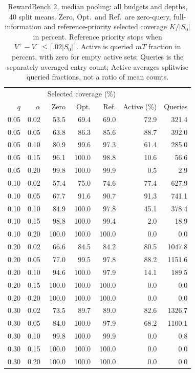 \begin{table}[t]
\centering\small
\begin{tabular}{rrrrrrr}
\toprule
 & & \multicolumn{3}{c}{Selected coverage (\%)} & & \\
$q$ & $\alpha$ & Zero & Opt. & Ref. & Active (\%) & Queries \\
\midrule
0.05 & 0.02 & 53.5 & 69.4 & 69.0 & 72.9 & 321.4 \\
0.05 & 0.05 & 63.8 & 86.3 & 85.6 & 88.7 & 392.0 \\
0.05 & 0.10 & 80.9 & 99.6 & 97.3 & 61.4 & 285.0 \\
0.05 & 0.15 & 96.1 & 100.0 & 98.8 & 10.6 & 56.6 \\
0.05 & 0.20 & 99.8 & 100.0 & 99.9 & 0.5 & 2.9 \\
0.10 & 0.02 & 57.4 & 75.0 & 74.6 & 77.4 & 627.9 \\
0.10 & 0.05 & 67.7 & 91.6 & 90.7 & 91.3 & 741.1 \\
0.10 & 0.10 & 84.9 & 100.0 & 97.8 & 45.1 & 378.4 \\
0.10 & 0.15 & 98.8 & 100.0 & 99.4 & 2.0 & 18.9 \\
0.10 & 0.20 & 100.0 & 100.0 & 100.0 & 0.0 & 0.0 \\
0.20 & 0.02 & 66.6 & 84.5 & 84.2 & 80.5 & 1047.8 \\
0.20 & 0.05 & 77.0 & 99.5 & 97.8 & 88.2 & 1151.6 \\
0.20 & 0.10 & 94.6 & 100.0 & 97.9 & 14.1 & 189.5 \\
0.20 & 0.15 & 100.0 & 100.0 & 100.0 & 0.0 & 0.0 \\
0.20 & 0.20 & 100.0 & 100.0 & 100.0 & 0.0 & 0.0 \\
0.30 & 0.02 & 73.5 & 89.7 & 89.0 & 82.6 & 1326.7 \\
0.30 & 0.05 & 84.0 & 100.0 & 97.9 & 68.2 & 1100.1 \\
0.30 & 0.10 & 99.8 & 100.0 & 99.9 & 0.0 & 0.8 \\
0.30 & 0.15 & 100.0 & 100.0 & 100.0 & 0.0 & 0.0 \\
0.30 & 0.20 & 100.0 & 100.0 & 100.0 & 0.0 & 0.0 \\
\bottomrule
\end{tabular}
\caption{RewardBench 2, median pooling: all budgets and depths, 40 split means. Zero, Opt.\ and Ref.\ are zero-query, full-information and reference-priority selected coverage $K/|S_0|$ in percent. Reference priority stops when $V^+-V^-\le\lceil.02|S_0|\rceil$. Active is queried $mT$ fraction in percent, with zero for empty active sets; Queries is the separately averaged entry count; Active averages splitwise queried fractions, not a ratio of mean counts.}
\label{tab:review-budget-0-median}
\end{table}
